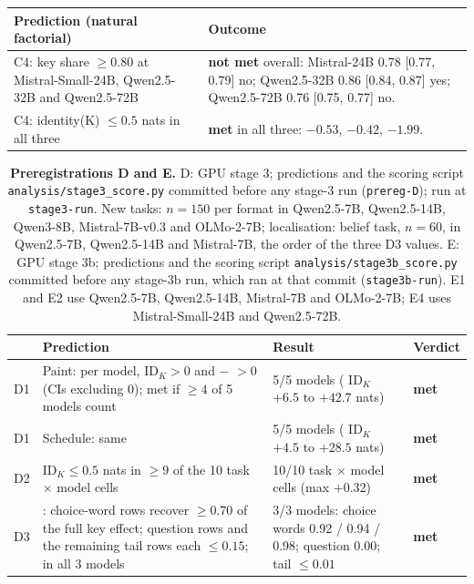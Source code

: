 \begin{table}[!ht]
\medskip
\begin{tabular}{p{}p{}}
\toprule
Prediction (natural factorial) & Outcome \\
\midrule
C4: \fmtOpt{} key share $\geq 0.80$ at Mistral-Small-24B, Qwen2.5-32B and Qwen2.5-72B & \textbf{not met} overall: Mistral-24B 0.78 [0.77, 0.79] no; Qwen2.5-32B 0.86 [0.84, 0.87] yes; Qwen2.5-72B 0.76 [0.75, 0.77] no. \\
C4: \fmtBefore{} identity(K) $\leq 0.5$ nats in all three & \textbf{met} in all three: $-0.53$, $-0.42$, $-1.99$. \\
\bottomrule
\end{tabular}
\end{table}

\begin{table}[!ht]
\centering
\footnotesize
\caption{\textbf{Preregistrations D and E.} D: GPU stage 3; predictions and the scoring script \texttt{analysis/stage3\_score.py} committed before any stage-3 run (\texttt{prereg-D}); run at \texttt{stage3-run}. New tasks: $n = 150$ per format in Qwen2.5-7B, Qwen2.5-14B, Qwen3-8B, Mistral-7B-v0.3 and OLMo-2-7B; localisation: belief task, $n = 60$, in Qwen2.5-7B, Qwen2.5-14B and Mistral-7B, the order of the three D3 values. E: GPU stage 3b; predictions and the scoring script \texttt{analysis/stage3b\_score.py} committed before any stage-3b run, which ran at that commit (\texttt{stage3b-run}). E1 and E2 use Qwen2.5-7B, Qwen2.5-14B, Mistral-7B and OLMo-2-7B; E4 uses Mistral-Small-24B and Qwen2.5-72B.}
\label{tab:prereg-de}
\begin{tabular}{p{}p{}p{}p{}}
\toprule
 & Prediction & Result & Verdict \\
\midrule
D1 & Paint: per model, \fmtOpt{} ID$_K > 0$ and \fmtOpt{} $-$ \fmtNone{} $> 0$ (CIs excluding 0); met if $\geq 4$ of 5 models count & 5/5 models (\fmtOpt{} ID$_K$ $+6.5$ to $+42.7$ nats) & \textbf{met} \\
D1 & Schedule: same & 5/5 models (\fmtOpt{} ID$_K$ $+4.5$ to $+28.5$ nats) & \textbf{met} \\
D2 & \fmtBefore{} ID$_K \leq 0.5$ nats in $\geq 9$ of the 10 task $\times$ model cells & 10/10 task $\times$ model cells (max $+0.32$) & \textbf{met} \\
D3 & \fmtOpt{}: choice-word rows recover $\geq 0.70$ of the full key effect; question rows and the remaining tail rows each $\leq 0.15$; in all 3 models & 3/3 models: choice words 0.92 / 0.94 / 0.98; question 0.00; tail $\leq 0.01$ & \textbf{met} \\

\end{tabular}
\end{table}
